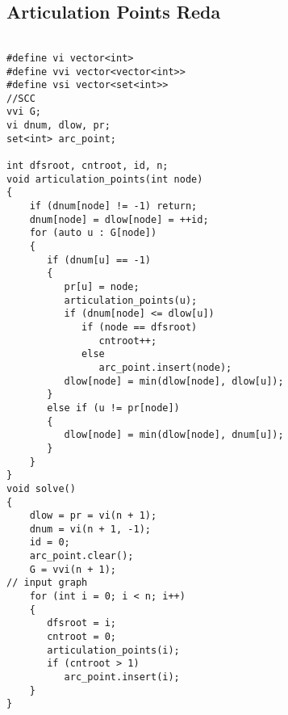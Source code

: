 \documentclass{article}
\begin{document}
\subsection{Articulation Points Reda}
\begin{verbatim}
  
#define vi vector<int>  
#define vvi vector<vector<int>>  
#define vsi vector<set<int>>  
//SCC  
vvi G;  
vi dnum, dlow, pr;  
set<int> arc_point;  
  
int dfsroot, cntroot, id, n;  
void articulation_points(int node)  
{  
    if (dnum[node] != -1) return;  
    dnum[node] = dlow[node] = ++id;  
    for (auto u : G[node])  
    {  
       if (dnum[u] == -1)  
       {  
          pr[u] = node;  
          articulation_points(u);  
          if (dnum[node] <= dlow[u])  
             if (node == dfsroot)  
                cntroot++;  
             else  
                arc_point.insert(node);  
          dlow[node] = min(dlow[node], dlow[u]);  
       }  
       else if (u != pr[node])  
       {  
          dlow[node] = min(dlow[node], dnum[u]);  
       }  
    }  
}  
void solve()  
{  
    dlow = pr = vi(n + 1);  
    dnum = vi(n + 1, -1);  
    id = 0;  
    arc_point.clear();  
    G = vvi(n + 1);  
// input graph  
    for (int i = 0; i < n; i++)  
    {  
       dfsroot = i;  
       cntroot = 0;  
       articulation_points(i);  
       if (cntroot > 1)  
          arc_point.insert(i);  
    }  
}
\end{verbatim}
\end{document}
